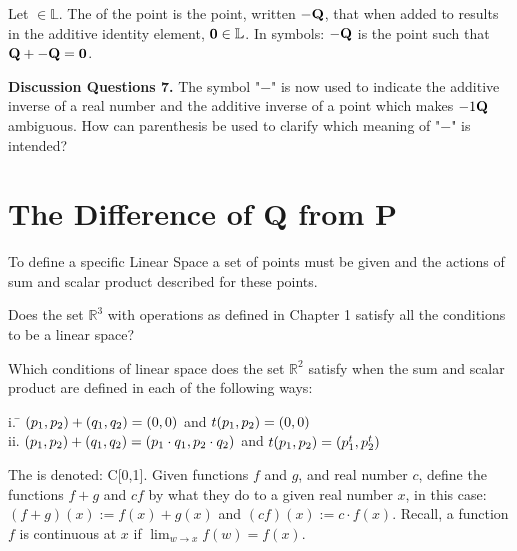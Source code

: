 \begin{defn}
	Let  $\in \mathbb{L}$. The  of the point  is the point, written $-\textbf{Q}$, that when added to  results in the additive identity element, $\textbf{0}\in \mathbb{L}$. In symbols: $-\textbf{Q}$ is the point such that $\textbf{Q} + -\textbf{Q} = \textbf{0}$.
\end{defn}

\noindent \textbf{Discussion Questions 7.}
The symbol "$-$" is now used to indicate the additive inverse of a real number and the additive inverse of a point which makes $-1\textbf{Q}$  ambiguous. How can parenthesis be used to clarify which meaning of "$-$" is intended?

\section{The Difference of Q from P  }    \label{The Difference of Q from P}

To define a specific Linear Space a set of points must be given and the actions of sum and scalar product described for these points.

\begin{myexa}[\bd{a}]
	Does the set $\mathbb{R}^3$ with operations as defined in Chapter 1 satisfy all the conditions to be a linear space?
\end{myexa}

\begin{myexb}[\bd{b}]
	Which conditions of linear space does the set $\mathbb{R}^2$ satisfy when the sum and scalar product are defined in each of the following ways:
	\begin{tabbing}
		\indent i. \quad  \= $({p_1},{p_2})+({q_1},{q_2}) = ({0},{0})$  and $t({p_1},{p_2}) = ({0},{0})$\\
		\indent ii. \> $({p_1},{p_2})+({q_1},{q_2}) = ({p_1 \cdot q_1},{p_2 \cdot q_2})$  and $t({p_1},{p_2}) = ({p_1^t},{p_2^t})$\\
	\end{tabbing}
\end{myexb}


     
\begin{defn}
	The  is denoted: C[0,1]. Given functions $f$ and $g$, and real number $c$, define the functions $f+g$ and $cf$ by what they do to a given real number $x$, in this case: $(f+g)(x):=f(x) +g(x)$ and $(cf)(x) := c \cdot f(x)$. Recall, a function $f$ is continuous at $x$ if $\lim_{w \rightarrow x}  f(w) = f(x).$
\end{defn}     

